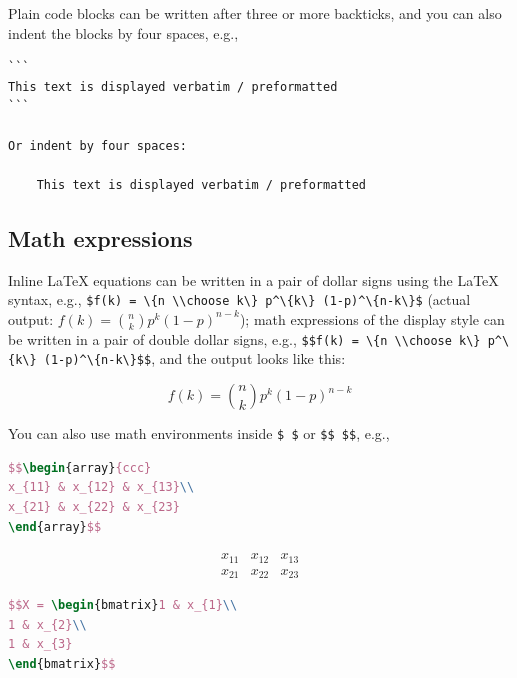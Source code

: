 \documentclass[doctor,openright,twoside]{sjtuthesis}
\newcommand{\passthrough}[1]{#1}
\theoremstyle{plain}
\theoremstyle{definition}
\theoremstyle{remark}
\theoremstyle{ocrenumbox}
\theoremstyle{plain}
\begin{document}
Plain code blocks can be written after three or more backticks, and you
can also indent the blocks by four spaces, e.g.,

\begin{lstlisting}
```
This text is displayed verbatim / preformatted
```

Or indent by four spaces:

    This text is displayed verbatim / preformatted
\end{lstlisting}

\hypertarget{math-expressions}{%
\subsection{Math expressions}\label{math-expressions}}

Inline LaTeX equations can be written in a
pair of dollar signs using the LaTeX syntax, e.g.,
\passthrough{\lstinline!$f(k) = \{n \\choose k\} p^\{k\} (1-p)^\{n-k\}$!}
(actual output: \(f(k)={n \choose k}p^{k}(1-p)^{n-k}\)); math
expressions of the display style can be written in a pair of double
dollar signs, e.g.,
\passthrough{\lstinline!$$f(k) = \{n \\choose k\} p^\{k\} (1-p)^\{n-k\}$$!},
and the output looks like this:

\[f\left(k\right)=\binom{n}{k}p^k\left(1-p\right)^{n-k}\]

You can also use math environments inside \passthrough{\lstinline!$ $!}
or \passthrough{\lstinline!$$ $$!}, e.g.,

\begin{lstlisting}[language=TeX]
$$\begin{array}{ccc}
x_{11} & x_{12} & x_{13}\\
x_{21} & x_{22} & x_{23}
\end{array}$$
\end{lstlisting}

\[\begin{array}{ccc}
x_{11} & x_{12} & x_{13}\\
x_{21} & x_{22} & x_{23}
\end{array}\]

\begin{lstlisting}[language=TeX]
$$X = \begin{bmatrix}1 & x_{1}\\
1 & x_{2}\\
1 & x_{3}
\end{bmatrix}$$
\end{lstlisting}
\end{document}

